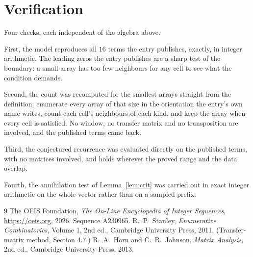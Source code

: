 \documentclass[11pt,a4paper]{article}
\theoremstyle{plain}
\theoremstyle{definition}
\begin{document}
\section{Verification}

Four checks, each independent of the algebra above.

First, the model reproduces all $16$ terms the entry publishes, exactly, in integer
arithmetic. The leading zeros the entry publishes are a sharp test of the boundary: a small
array has too few neighbours for any cell to see what the condition demands.

Second, the count was recomputed for the smallest arrays straight from the definition:
enumerate every array of that size in the orientation the entry's own name writes, count each
cell's neighbours of each kind, and keep the array when every cell is satisfied. No window, no
transfer matrix and no transposition are involved, and the published terms came back.

Third, the conjectured recurrence was evaluated directly on the published terms, with no
matrices involved, and holds wherever the proved range and the data overlap.

Fourth, the annihilation test of Lemma~\ref{lem:crit} was carried out in exact integer
arithmetic on the whole vector rather than on a sampled prefix.

\begin{thebibliography}{9}
 The OEIS Foundation, \emph{The On-Line Encyclopedia of Integer
Sequences}, \url{https://oeis.org}, 2026. Sequence A230965.
 R.~P.~Stanley, \emph{Enumerative Combinatorics}, Volume 1, 2nd ed.,
Cambridge University Press, 2011. (Transfer-matrix method, Section 4.7.)
 R.~A.~Horn and C.~R.~Johnson, \emph{Matrix Analysis}, 2nd ed., Cambridge
University Press, 2013.
\end{thebibliography}
\end{document}
